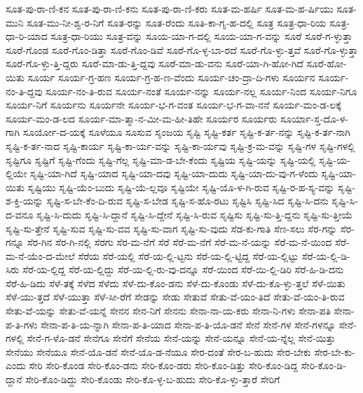 {ಸೂತ-ಪು-ರಾ-ಣಿ-ಕನ
ಸೂತ-ಪು-ರಾ-ಣಿ-ಕನು
ಸೂತ-ಪು-ರಾ-ಣಿ-ಕರು
ಸೂತ-ಮ-ಹರ್ಷಿ
ಸೂತ-ಮ-ಹ-ರ್ಷಿಯು
ಸೂತ-ಮುನಿ
ಸೂತ-ಮು-ನೀ-ಶ್ವ-ರ-ನಿಗೆ
ಸೂತ-ರನ್ನು
ಸೂತ-ರೆಂದು
ಸೂತಿ-ಕಾ-ಗೃ-ಹ-ದಲ್ಲಿ
ಸೂತ್ರ
ಸೂತ್ರ-ಧಾ-ರಿಯ
ಸೂತ್ರ-ಧಾ-ರಿ-ಯಾದ
ಸೂತ್ರ-ಧಾ-ರಿಯು
ಸೂತ್ರ-ವನ್ನು
ಸೂಯ-ಯಾ-ಗ-ದಲ್ಲಿ
ಸೂಯ-ಯಾ-ಗ-ವನ್ನು
ಸೂರೆ
ಸೂರೆ-ಗ-ಳ್ಳುತ್ತಾ
ಸೂರೆ-ಗೊಂಡ
ಸೂರೆ-ಗೊಂ-ಡಿತ್ತಾ
ಸೂರೆ-ಗೊಂ-ಡಿವೆ
ಸೂರೆ-ಗೊ-ಳ್ಳ-ಬಾ-ರದೆ
ಸೂರೆ-ಗೊ-ಳ್ಳು-ತ್ತವೆ
ಸೂರೆ-ಗೊ-ಳ್ಳುತ್ತಾ
ಸೂರೆ-ಗೊ-ಳ್ಳು-ತ್ತಿ-ದ್ದರು
ಸೂರೆ-ಮಾ-ಡು-ತ್ತಿ-ದ್ದವು
ಸೂರೆ-ಮಾ-ಡು-ವನು
ಸೂರೆ-ಯಾ-ಗಿ-ಹೋ-ಗಿದೆ
ಸೂರೆ-ಹೋ-ಯಿತು
ಸೂರ್ಯ
ಸೂರ್ಯ-ಗ್ರ-ಹಣ
ಸೂರ್ಯ-ಗ್ರ-ಹ-ಣ-ವೆಂದು
ಸೂರ್ಯ-ಚಂ-ದ್ರಾ-ದಿ-ಗಳು
ಸೂರ್ಯನ
ಸೂರ್ಯ-ನಂ-ತಿ-ದ್ದವು
ಸೂರ್ಯ-ನಂ-ತಿ-ರುವ
ಸೂರ್ಯ-ನಂತೆ
ಸೂರ್ಯ-ನನ್ನು
ಸೂರ್ಯ-ನಲ್ಲ
ಸೂರ್ಯ-ನಿಂದ
ಸೂರ್ಯ-ನಿಗೂ
ಸೂರ್ಯ-ನಿಗೆ
ಸೂರ್ಯನು
ಸೂರ್ಯನೇ
ಸೂರ್ಯ-ಭ-ಗ-ವಂತ
ಸೂರ್ಯ-ಭ-ಗ-ವಾ-ನನೆ
ಸೂರ್ಯ-ಮಂ-ಡ-ಲಕ್ಕೆ
ಸೂರ್ಯ-ಮಂ-ಡ-ಲದ
ಸೂರ್ಯ-ಮಾ-ತ್ಮಾ-ನ-ಮೀ-ಮ-ಹೀ-ತಿಹೇ
ಸೂರ್ಯರ
ಸೂರ್ಯರು
ಸೂರ್ಯಾ-ಸ್ತ-ದೊ-ಳ-ಗಾಗಿ
ಸೂರ್ಯೋ-ದ-ಯಕ್ಕೆ
ಸೂಳೆಯೂ
ಸೂಸುವ
ಸೃಂಜಯ
ಸೃಷ್ಟಿ
ಸೃಷ್ಟಿ-ಕರ್ತ
ಸೃಷ್ಟಿ-ಕ-ರ್ತ-ನನ್ನು
ಸೃಷ್ಟಿ-ಕ-ರ್ತ-ನಾಗಿ
ಸೃಷ್ಟಿ-ಕ-ರ್ತ-ನಾದ
ಸೃಷ್ಟಿ-ಕಾರ್ಯ
ಸೃಷ್ಟಿ-ಕಾ-ರ್ಯ-ವನ್ನು
ಸೃಷ್ಟಿ-ಕಾ-ರ್ಯವು
ಸೃಷ್ಟಿ-ಕ್ರ-ಮ-ವನ್ನು
ಸೃಷ್ಟಿ-ಗಳ
ಸೃಷ್ಟಿ-ಗಳಲ್ಲಿ
ಸೃಷ್ಟಿಗೂ
ಸೃಷ್ಟಿಗೆ
ಸೃಷ್ಟಿ-ಗೆಂದು
ಸೃಷ್ಟಿ-ಗೆಲ್ಲ
ಸೃಷ್ಟಿ-ಮಾ-ಡ-ಬೇ-ಕೆಂದು
ಸೃಷ್ಟಿಯ
ಸೃಷ್ಟಿ-ಯನ್ನು
ಸೃಷ್ಟಿ-ಯಲ್ಲಿ
ಸೃಷ್ಟಿ-ಯ-ಲ್ಲಿಯೇ
ಸೃಷ್ಟಿ-ಯಾ-ಗಿದೆ
ಸೃಷ್ಟಿ-ಯಾದ
ಸೃಷ್ಟಿ-ಯಾ-ದವು
ಸೃಷ್ಟಿ-ಯಾ-ದುದು
ಸೃಷ್ಟಿ-ಯಾ-ದು-ವು-ಗ-ಳೆಂದು
ಸೃಷ್ಟಿ-ಯಾ-ಯಿತು
ಸೃಷ್ಟಿಯು
ಸೃಷ್ಟಿ-ಯೆಂ-ಬುದು
ಸೃಷ್ಟಿ-ಯೆ-ಲ್ಲವೂ
ಸೃಷ್ಟಿಯೇ
ಸೃಷ್ಟಿ-ಯೊ-ಳ-ಗಿ-ರುವ
ಸೃಷ್ಟಿ-ರ-ಹ-ಸ್ಯ-ವನ್ನು
ಸೃಷ್ಟಿ-ಶ-ಕ್ತಿ-ಯನ್ನು
ಸೃಷ್ಟಿ-ಸ-ಬೇ-ಕೆಂ-ದಿ-ರುವ
ಸೃಷ್ಟಿ-ಸ-ಬೇಡ
ಸೃಷ್ಟಿ-ಸ-ಹೊ-ರಟು
ಸೃಷ್ಟಿಸಿ
ಸೃಷ್ಟಿ-ಸಿದ
ಸೃಷ್ಟಿ-ಸಿ-ದನು
ಸೃಷ್ಟಿ-ಸಿ-ದ-ವನೂ
ಸೃಷ್ಟಿ-ಸಿ-ದುದು
ಸೃಷ್ಟಿ-ಸಿ-ದ್ದಾನೆ
ಸೃಷ್ಟಿ-ಸಿ-ದ್ದೇನೆ
ಸೃಷ್ಟಿ-ಸಿ-ರುವ
ಸೃಷ್ಟಿಸು
ಸೃಷ್ಟಿ-ಸು-ತ್ತಿ-ದ್ದನು
ಸೃಷ್ಟಿ-ಸು-ತ್ತೀಯೆ
ಸೃಷ್ಟಿ-ಸು-ತ್ತೇನೆ
ಸೃಷ್ಟಿ-ಸುವ
ಸೃಷ್ಟಿ-ಸು-ವವ
ಸೃಷ್ಟಿ-ಸು-ವಾಗ
ಸೃಷ್ಟಿ-ಸು-ವುದು
ಸೆಡ-ಕು-ಗಾತಿ
ಸೆಣ-ಸಲು
ಸೆರ-ಗನ್ನು
ಸೆರ-ಗನ್ನೂ
ಸೆರ-ಗಿನ
ಸೆರ-ಗಿ-ನಲ್ಲಿ
ಸೆರಗು
ಸೆರ-ಮ-ನೆಗೆ
ಸೆರೆ
ಸೆರೆ-ಮ-ನೆಗೆ
ಸೆರೆ-ಮ-ನೆ-ಯನ್ನು
ಸೆರೆ-ಮ-ನೆ-ಯಿಂದ
ಸೆರೆ-ಮ-ನೆ-ಯೆಂ-ದ-ಮೇಲೆ
ಸೆರೆಯ
ಸೆರೆ-ಯಲ್ಲಿ
ಸೆರೆ-ಯ-ಲ್ಲಿ-ಟ್ಟನು
ಸೆರೆ-ಯ-ಲ್ಲಿ-ಟ್ಟಿದ್ದ
ಸೆರೆ-ಯ-ಲ್ಲಿಟ್ಟು
ಸೆರೆ-ಯ-ಲ್ಲಿ-ಡಿ-ಸಿರು
ಸೆರೆ-ಯ-ಲ್ಲಿದ್ದ
ಸೆರೆ-ಯ-ಲ್ಲಿದ್ದು
ಸೆರೆ-ಯ-ಲ್ಲಿ-ರು-ವು-ದನ್ನೂ
ಸೆರೆ-ಯಿಂದ
ಸೆರೆ-ಯಿ-ಲ್ಲಿ-ಡಿರಿ
ಸೆರೆ-ಹಿ-ಡಿ-ದನು
ಸೆರೆ-ಹಿ-ಡಿದು
ಸೆಳೆ-ತಕ್ಕೆ
ಸೆಳೆದ
ಸೆಳೆದು
ಸೆಳೆ-ದು-ಕೊಂ-ಡನು
ಸೆಳೆ-ದು-ಕೊಂಡು
ಸೆಳೆ-ದು-ಕೊ-ಳ್ಳು-ತ್ತಲೆ
ಸೆಳೆ-ಯಿತು
ಸೆಳೆ-ಯು-ತ್ತದೆ
ಸೆಳೆ-ಯುತ್ತಾ
ಸೆಳೆ-ಸೀ-ರೆಗೆ
ಸೇಡನ್ನು
ಸೇಡು
ಸೇತುವೆ
ಸೇತು-ವೆ-ಯಂ-ತಿದೆ
ಸೇತು-ವೆ-ಯಂ-ತಿ-ರುವ
ಸೇತು-ವೆ-ಯನ್ನು
ಸೇತು-ವೆ-ಯನ್ನೆ
ಸೇನನ
ಸೇನ-ನಿಗೆ
ಸೇನನು
ಸೇನಾ-ನಾ-ಯ-ಕರು
ಸೇನಾ-ನಿ-ಗಳು
ಸೇನಾ-ಪತಿ
ಸೇನಾ-ಪ-ತಿ-ಗಳು
ಸೇನಾ-ಪ-ತಿ-ಯ-ನ್ನಾಗಿ
ಸೇನಾ-ಪ-ತಿ-ಯಾದ
ಸೇನಾ-ಪ-ತಿ-ಯೊ-ಡನೆ
ಸೇನೆ
ಸೇನೆ-ಗಳ
ಸೇನೆ-ಗಳನ್ನೂ
ಸೇನೆ-ಗಳಲ್ಲಿ
ಸೇನೆ-ಗ-ಳೊ-ಡನೆ
ಸೇನೆಗೂ
ಸೇನೆಗೆ
ಸೇನೆಯ
ಸೇನೆ-ಯನ್ನು
ಸೇನೆ-ಯನ್ನೂ
ಸೇನೆ-ಯ-ನ್ನೆಲ್ಲ
ಸೇನೆ-ಯಿತ್ತು
ಸೇನೆಯು
ಸೇನೆಯೂ
ಸೇನೆ-ಯೊ-ಡನೆ
ಸೇನೆ-ಯೊ-ಡ-ನೆಯೂ
ಸೇರ-ದಂತೆ
ಸೇರ-ಬ-ಹುದು
ಸೇರ-ಬೇಕು
ಸೇರ-ಬೇ-ಕು-ಎಂದು
ಸೇರಿ
ಸೇರಿ-ಕೊಂಡ
ಸೇರಿ-ಕೊಂ-ಡನು
ಸೇರಿ-ಕೊಂ-ಡರು
ಸೇರಿ-ಕೊಂ-ಡಿತ್ತು
ಸೇರಿ-ಕೊಂ-ಡಿದ್ದ
ಸೇರಿ-ಕೊಂ-ಡಿ-ದ್ದಾನೆ
ಸೇರಿ-ಕೊಂ-ಡಿದ್ದು
ಸೇರಿ-ಕೊಂಡು
ಸೇರಿ-ಕೊ-ಳ್ಳ-ಬ-ಹುದು
ಸೇರಿ-ಕೊ-ಳ್ಳು-ತ್ತಾರೆ
ಸೇರಿಗೆ
}
